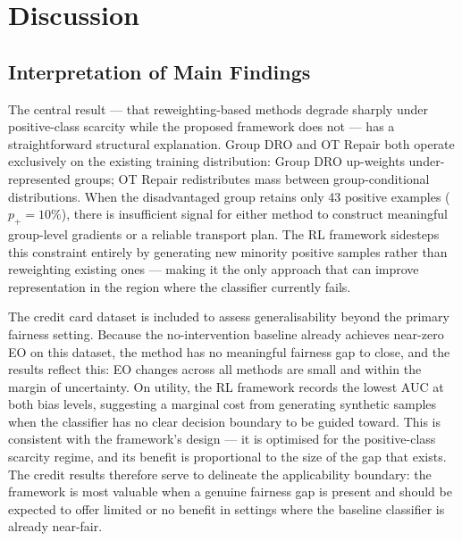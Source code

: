 
\section{Discussion}
\label{sec:discussion}

\subsection{Interpretation of Main Findings}

The central result — that reweighting-based methods degrade sharply under
positive-class scarcity while the proposed framework does not — has a
straightforward structural explanation.
Group DRO and OT Repair both operate exclusively on the existing training
distribution: Group DRO up-weights under-represented groups; OT Repair
redistributes mass between group-conditional distributions.
When the disadvantaged group retains only 43 positive examples ($p_+ = 10\%$),
there is insufficient signal for either method to construct meaningful
group-level gradients or a reliable transport plan.
The RL framework sidesteps this constraint entirely by generating new minority
positive samples rather than reweighting existing ones — making it the only
approach that can improve representation in the region where the classifier
currently fails.

The credit card dataset is included to assess generalisability beyond the
primary fairness setting.
Because the no-intervention baseline already achieves near-zero EO on this
dataset, the method has no meaningful fairness gap to close, and the results
reflect this: EO changes across all methods are small and within the margin
of uncertainty.
On utility, the RL framework records the lowest AUC at both bias levels,
suggesting a marginal cost from generating synthetic samples when the
classifier has no clear decision boundary to be guided toward.
This is consistent with the framework's design — it is optimised for the
positive-class scarcity regime, and its benefit is proportional to the
size of the gap that exists.
The credit results therefore serve to delineate the applicability boundary:
the framework is most valuable when a genuine fairness gap is present and
should be expected to offer limited or no benefit in settings where the
baseline classifier is already near-fair.

